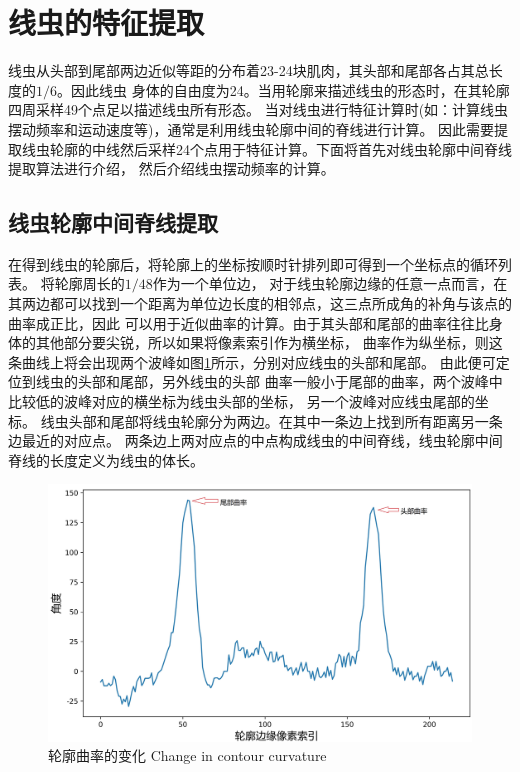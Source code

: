 \section{线虫的特征提取}
	线虫从头部到尾部两边近似等距的分布着23-24块肌肉，其头部和尾部各占其总长度的$1/6$。因此线虫
	身体的自由度为24。当用轮廓来描述线虫的形态时，在其轮廓四周采样49个点足以描述线虫所有形态。
	当对线虫进行特征计算时(如：计算线虫摆动频率和运动速度等)，通常是利用线虫轮廓中间的脊线进行计算。
	因此需要提取线虫轮廓的中线然后采样24个点用于特征计算。下面将首先对线虫轮廓中间脊线提取算法进行介绍，
	然后介绍线虫摆动频率的计算。
\subsection{线虫轮廓中间脊线提取}
	在得到线虫的轮廓后，将轮廓上的坐标按顺时针排列即可得到一个坐标点的循环列表。
	将轮廓周长的$1/48$作为一个单位边，
	对于线虫轮廓边缘的任意一点而言，在其两边都可以找到一个距离为单位边长度的相邻点，这三点所成角的补角与该点的曲率成正比，因此
	可以用于近似曲率的计算。由于其头部和尾部的曲率往往比身体的其他部分要尖锐，所以如果将像素索引作为横坐标，
	曲率作为纵坐标，则这条曲线上将会出现两个波峰如图\ref{fig:qulv}所示，分别对应线虫的头部和尾部。
	由此便可定位到线虫的头部和尾部，另外线虫的头部
	曲率一般小于尾部的曲率，两个波峰中比较低的波峰对应的横坐标为线虫头部的坐标，
	另一个波峰对应线虫尾部的坐标。
	线虫头部和尾部将线虫轮廓分为两边。在其中一条边上找到所有距离另一条边最近的对应点。
	两条边上两对应点的中点构成线虫的中间脊线，线虫轮廓中间脊线的长度定义为线虫的体长。
	\begin{figure}[h]
	  \centering
	  \includegraphics[width=14cm]{figure/chap5/cuvature.jpg}
	  \bicaption
		{轮廓曲率的变化}
		{Change in contour curvature}
	  \label{fig:qulv}
	\end{figure}
